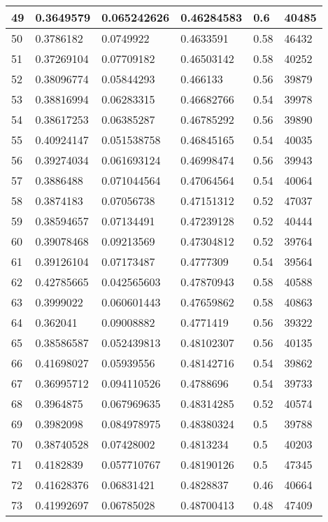 \begin{longtable}{|l|l|l|l|l|l|}
49 & 0.3649579 & 0.065242626 & 0.46284583 & 0.6 & 40485 \\ \hline 
50 & 0.3786182 & 0.0749922 & 0.4633591 & 0.58 & 46432 \\ \hline 
51 & 0.37269104 & 0.07709182 & 0.46503142 & 0.58 & 40252 \\ \hline 
52 & 0.38096774 & 0.05844293 & 0.466133 & 0.56 & 39879 \\ \hline 
53 & 0.38816994 & 0.06283315 & 0.46682766 & 0.54 & 39978 \\ \hline 
54 & 0.38617253 & 0.06385287 & 0.46785292 & 0.56 & 39890 \\ \hline 
55 & 0.40924147 & 0.051538758 & 0.46845165 & 0.54 & 40035 \\ \hline 
56 & 0.39274034 & 0.061693124 & 0.46998474 & 0.56 & 39943 \\ \hline 
57 & 0.3886488 & 0.071044564 & 0.47064564 & 0.54 & 40064 \\ \hline 
58 & 0.3874183 & 0.07056738 & 0.47151312 & 0.52 & 47037 \\ \hline 
59 & 0.38594657 & 0.07134491 & 0.47239128 & 0.52 & 40444 \\ \hline 
60 & 0.39078468 & 0.09213569 & 0.47304812 & 0.52 & 39764 \\ \hline 
61 & 0.39126104 & 0.07173487 & 0.4777309 & 0.54 & 39564 \\ \hline 
62 & 0.42785665 & 0.042565603 & 0.47870943 & 0.58 & 40588 \\ \hline 
63 & 0.3999022 & 0.060601443 & 0.47659862 & 0.58 & 40863 \\ \hline 
64 & 0.362041 & 0.09008882 & 0.4771419 & 0.56 & 39322 \\ \hline 
65 & 0.38586587 & 0.052439813 & 0.48102307 & 0.56 & 40135 \\ \hline 
66 & 0.41698027 & 0.05939556 & 0.48142716 & 0.54 & 39862 \\ \hline 
67 & 0.36995712 & 0.094110526 & 0.4788696 & 0.54 & 39733 \\ \hline 
68 & 0.3964875 & 0.067969635 & 0.48314285 & 0.52 & 40574 \\ \hline 
69 & 0.3982098 & 0.084978975 & 0.48380324 & 0.5 & 39788 \\ \hline 
70 & 0.38740528 & 0.07428002 & 0.4813234 & 0.5 & 40203 \\ \hline 
71 & 0.4182839 & 0.057710767 & 0.48190126 & 0.5 & 47345 \\ \hline 
72 & 0.41628376 & 0.06831421 & 0.4828837 & 0.46 & 40664 \\ \hline 
73 & 0.41992697 & 0.06785028 & 0.48700413 & 0.48 & 47409 \\ \hline 

\end{longtable}
